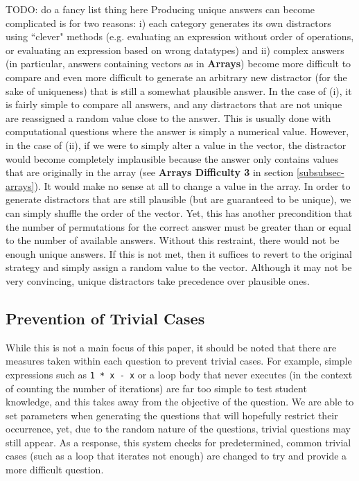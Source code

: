 \documentclass{article}
\begin{document}
TODO: do a fancy list thing here
Producing unique answers can become complicated is for two reasons: i) each category generates its own distractors using ``clever" methods (e.g. evaluating an expression
without order of operations, or evaluating an expression based on wrong datatypes) and ii) complex answers
(in particular, answers containing vectors as in \textbf{Arrays}) become more difficult to compare and even more difficult
to generate an arbitrary new distractor (for the sake of uniqueness) that is still a somewhat plausible answer.
In the case of (i), it is fairly simple to compare all answers, and any distractors that are not unique are reassigned
a random value close to the answer. This is usually done with computational questions where the answer is simply a
numerical value. However, in the case of (ii), if we were to simply alter a value in the vector, the distractor would
become completely implausible because the answer only contains values that are originally in the array (see \textbf{Arrays Difficulty 3} in section \ref{subsubsec-arrays}). 
It would make no sense at all to change a value in the array. In order to generate distractors that
are still plausible (but are guaranteed to be unique), we can simply shuffle the order of the vector. Yet, this has
another precondition that the number of permutations for the correct answer must be greater than or equal to the
number of available answers. Without this restraint, there would not be enough unique answers. If this is not met,
then it suffices to revert to the original strategy and simply assign a random value to the vector. Although it may
not be very convincing, unique distractors take precedence over plausible ones.

\subsection{Prevention of Trivial Cases} \label{sec-prevention_of_trivial_cases}

While this is not a main focus of this paper, it should be noted that there are measures taken within each question to prevent trivial cases. For example, simple expressions such as \verb;1 * x - x; or a loop body that never executes (in the context of counting the number of iterations) are far too simple to test student knowledge, and this takes away from the objective of the question. We are able to set parameters when generating the questions that will hopefully restrict their occurrence, yet, due to the random nature of the questions, trivial questions may still appear. As a response, this system checks for predetermined, common trivial cases (such as a loop that iterates not enough) are changed to try and provide a more difficult question.
\end{document}
